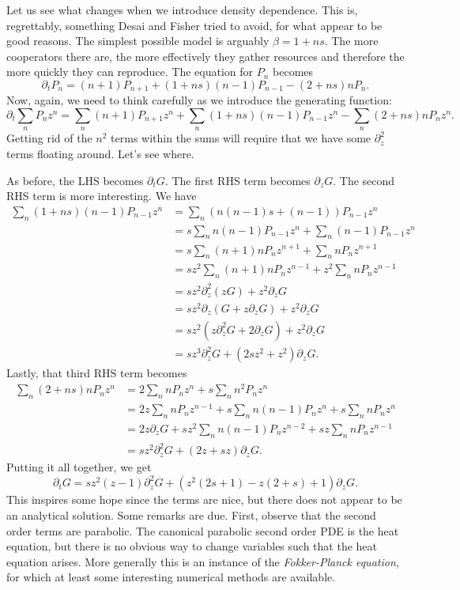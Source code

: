 \documentclass[10pt]{revtex4}
\begin{document}
Let us see what changes when we introduce density dependence.
This is, regrettably, something Desai and Fisher tried to avoid, for what appear to be good reasons.
The simplest possible model is arguably $\beta = 1+ns$.
The more cooperators there are, the more effectively they gather resources and therefore the more quickly they can reproduce.
The equation for $P_n$ becomes
\begin{equation}
\partial_t P_n = (n+1)P_{n+1} + (1+ns)(n-1)P_{n-1} - (2+ns) nP_n.
\end{equation}
Now, again, we need to think carefully as we introduce the generating function:
\begin{equation}
\partial_t \sum_n P_n z^n = \sum_n (n+1)P_{n+1}z^n + \sum_n (1+ns)(n-1)P_{n-1}z^n - \sum_n (2+ns) nP_n z^n.
\end{equation}
Getting rid of the $n^2$ terms within the sums will require that we have some $\partial_z^2$ terms floating around.
Let's see where.

As before, the LHS becomes $\partial_t G$.
The first RHS term becomes $\partial_z G$.
The second RHS term is more interesting. We have
\begin{align}
\sum_n (1+ns)(n-1)P_{n-1}z^n &= \sum_n (n(n-1)s + (n-1))P_{n-1}z^n \nonumber \\
&= s\sum_n n(n-1)P_{n-1}z^n + \sum_n (n-1)P_{n-1}z^n \nonumber \\
&= s\sum_n (n+1)nP_n z^{n+1} + \sum_n n P_n z^{n+1} \nonumber \\
&= sz^2\sum_n (n+1)nP_n z^{n-1} + z^2 \sum_n n P_n z^{n-1} \nonumber \\
&= sz^2\partial_z^2 (zG) + z^2 \partial_z G \nonumber \\
&= sz^2 \partial_z (G + z\partial_z G) + z^2 \partial_z G \nonumber \\
&= sz^2 (z\partial_z^2 G + 2\partial_z G) + z^2\partial_z G \nonumber \\
&= sz^3 \partial_z^2 G + (2sz^2 + z^2)\partial_z G.
\end{align}
Lastly, that third RHS term becomes
\begin{align}
\sum_n (2+ns) nP_n z^n &= 2\sum_n nP_n z^n + s\sum_n n^2 P_n z^n \nonumber \\
&= 2z \sum_n nP_n z^{n-1} + s\sum_n n(n-1) P_n z^n + s\sum_n nP_n z^n \nonumber \\
&= 2z \partial_z G + sz^2\sum_n n(n-1) P_n z^{n-2} + sz\sum_n nP_n z^{n-1} \nonumber \\
&= sz^2 \partial_z^2 G + (2z+sz)\partial_z G.
\end{align}
Putting it all together, we get
\begin{equation}
\partial_t G = sz^2(z-1) \partial_z^2 G + (z^2(2s+1) - z(2+s) + 1)\partial_z G.
\end{equation}
This inspires some hope since the terms are nice, but there does not appear to be an analytical solution.
Some remarks are due.
First, observe that the second order terms are parabolic.
The canonical parabolic second order PDE is the heat equation, but there is no obvious way to change variables such that the heat equation arises.
More generally this is an instance of the \emph{Fokker-Planck equation}, for which at least some interesting numerical methods are available.
\end{document}

